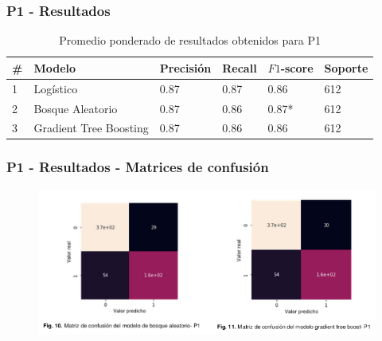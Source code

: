 \documentclass[xcolor=dvipsnames, compress]{beamer}
\begin{document}
\begin{frame}
\frametitle{P1 - Resultados}


\begin{table}[tbhp]
	\centering

	\label{tab:p1_results}
	\begin{tabular}{@{}llllll@{}}
		\hline
		\# & Modelo & Precisión & Recall & $F1$-score & Soporte \\ \hline
		1 & Logístico & 0.87 & 0.87 & 0.86 & 612 \\
		2 & Bosque Aleatorio & 0.87 & 0.86 & 0.87* & 612 \\
		3 & Gradient Tree Boosting & 0.87 & 0.86 & 0.86 & 612 \\ \hline
	\end{tabular}

	\caption{Promedio ponderado de resultados obtenidos para P1 }
\end{table}

\end{frame}


\begin{frame}
\frametitle{P1 - Resultados - Matrices de confusión}
\begin{figure}
	\includegraphics[scale=0.5]{images/p1_results_matrix.png}
\end{figure}
\end{frame}
\end{document}
